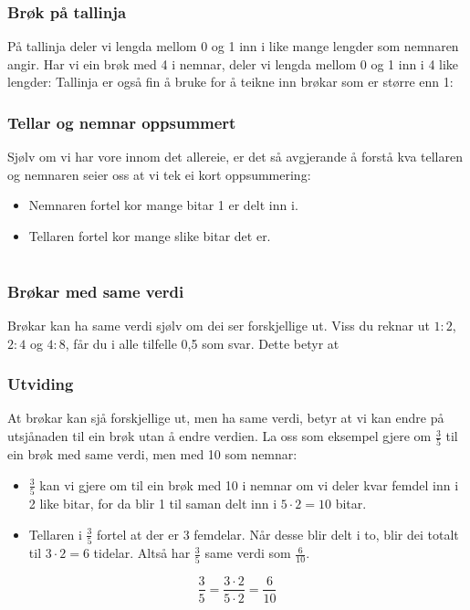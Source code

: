 \newpage
\subsubsection{Brøk på tallinja}
På tallinja deler vi lengda mellom 0 og 1 inn i like mange lengder som nemnaren angir. Har vi ein brøk med 4 i nemnar, deler vi lengda mellom 0 og 1 inn i 4 like lengder:
Tallinja er også fin å bruke for å teikne inn brøkar som er større enn 1:
\subsubsection{Tellar og nemnar oppsummert}
Sjølv om vi har vore innom det allereie, er det så avgjerande å forstå kva tellaren og nemnaren seier oss at vi tek ei kort oppsummering:
\begin{itemize}
	\item Nemnaren fortel kor mange bitar 1 er delt inn i.
	\item Tellaren fortel kor mange slike bitar det er.
\end{itemize}
\newpage
\section{\brvu}
\subsubsection{Brøkar med same verdi}

Brøkar kan ha same verdi sjølv om dei ser forskjellige ut. Viss du reknar ut $ 1:2 $, $ 2:4 $ og $ 4:8 $, får du i alle tilfelle 0,5 som svar. Dette betyr at
 \\[5pt]
 \vsk
{}
\subsubsection{Utviding}
At brøkar kan sjå forskjellige ut, men ha same verdi, betyr at vi kan endre på utsjånaden til ein brøk utan å endre verdien. La oss som eksempel gjere om $ \frac{3}{5} $ til ein brøk med same verdi, men med 10 som nemnar:
\begin{itemize}
	\item $ \frac{3}{5} $ kan vi gjere om til ein brøk med 10 i nemnar om vi deler kvar femdel inn i 2 like bitar, for da blir 1 til saman delt inn i $ {5\cdot2=10} $ bitar.
	\item Tellaren i $ \frac{3}{5} $ fortel at der er 3 femdelar. Når desse blir delt i to, blir dei totalt til $ 3\cdot2=6 $ tidelar. Altså har $ \frac{3}{5} $ same verdi som $ \frac{6}{10} $.
\end{itemize}
\[ \frac{3}{5}=\frac{3\cdot2}{5\cdot2}=\frac{6}{10} \]

